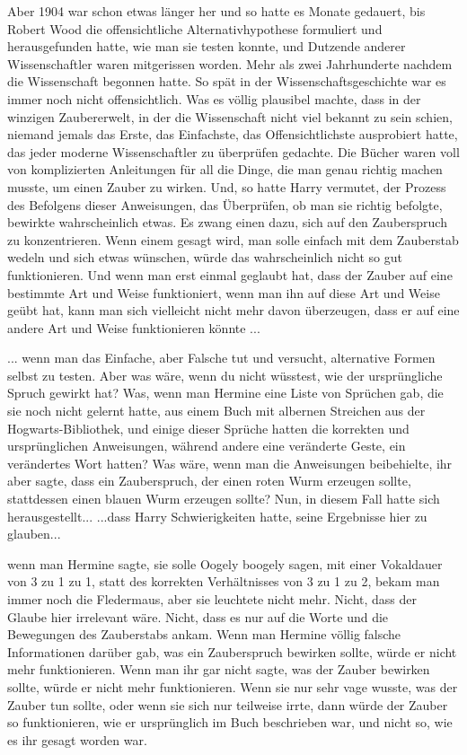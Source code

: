 Aber 1904 war schon etwas länger her und so hatte es Monate gedauert, bis Robert
Wood die offensichtliche Alternativhypothese formuliert und herausgefunden
hatte, wie man sie testen konnte, und Dutzende anderer Wissenschaftler waren
mitgerissen worden. Mehr als zwei Jahrhunderte nachdem die Wissenschaft begonnen
hatte. So spät in der Wissenschaftsgeschichte war es immer noch nicht
offensichtlich. Was es völlig plausibel machte, dass in der winzigen
Zaubererwelt, in der die Wissenschaft nicht viel bekannt zu sein schien, niemand
jemals das Erste, das Einfachste, das Offensichtlichste ausprobiert hatte, das
jeder moderne Wissenschaftler zu überprüfen gedachte. Die Bücher waren voll von
komplizierten Anleitungen für all die Dinge, die man genau richtig machen
musste, um einen Zauber zu wirken. Und, so hatte Harry vermutet, der Prozess des
Befolgens dieser Anweisungen, das Überprüfen, ob man sie richtig befolgte,
bewirkte wahrscheinlich etwas. Es zwang einen dazu, sich auf den Zauberspruch zu
konzentrieren. Wenn einem gesagt wird, man solle einfach mit dem Zauberstab
wedeln und sich etwas wünschen, würde das wahrscheinlich nicht so gut
funktionieren. Und wenn man erst einmal geglaubt hat, dass der Zauber auf eine
bestimmte Art und Weise funktioniert, wenn man ihn auf diese Art und Weise geübt
hat, kann man sich vielleicht nicht mehr davon überzeugen, dass er auf eine
andere Art und Weise funktionieren könnte ...

... wenn man das Einfache, aber Falsche tut und versucht, alternative Formen
selbst zu testen. Aber was wäre, wenn du nicht wüsstest, wie der ursprüngliche
Spruch gewirkt hat? Was, wenn man Hermine eine Liste von Sprüchen gab, die sie
noch nicht gelernt hatte, aus einem Buch mit albernen Streichen aus der
Hogwarts-Bibliothek, und einige dieser Sprüche hatten die korrekten und
ursprünglichen Anweisungen, während andere eine veränderte Geste, ein
verändertes Wort hatten? Was wäre, wenn man die Anweisungen beibehielte, ihr
aber sagte, dass ein Zauberspruch, der einen roten Wurm erzeugen sollte,
stattdessen einen blauen Wurm erzeugen sollte? Nun, in diesem Fall hatte sich
herausgestellt... ...dass Harry Schwierigkeiten hatte, seine Ergebnisse hier zu
glauben...

wenn man Hermine sagte, sie solle \glqq Oogely boogely\grqq{} sagen, mit einer
Vokaldauer von 3 zu 1 zu 1, statt des korrekten Verhältnisses von 3 zu 1 zu 2,
bekam man immer noch die Fledermaus, aber sie leuchtete nicht mehr. Nicht, dass
der Glaube hier irrelevant wäre. Nicht, dass es nur auf die Worte und die
Bewegungen des Zauberstabs ankam. Wenn man Hermine völlig falsche Informationen
darüber gab, was ein Zauberspruch bewirken sollte, würde er nicht mehr
funktionieren. Wenn man ihr gar nicht sagte, was der Zauber bewirken sollte,
würde er nicht mehr funktionieren. Wenn sie nur sehr vage wusste, was der Zauber
tun sollte, oder wenn sie sich nur teilweise irrte, dann würde der Zauber so
funktionieren, wie er ursprünglich im Buch beschrieben war, und nicht so, wie es
ihr gesagt worden war.

